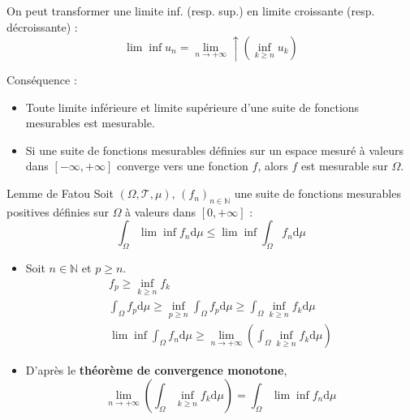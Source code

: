 \begin{Prop}{}{}
On peut transformer une limite inf. (resp. sup.) en limite croissante (resp. décroissante) : 
\begin{equation}
  \lim \inf u_n = \underset{n \to + \infty}{\lim} \uparrow \left( \underset{k \ge n}{\inf} u_k \right)
\end{equation}

Conséquence : 
\begin{itemize}

    \item Toute limite inférieure et limite supérieure d'une suite de fonctions mesurables est mesurable.

    \item Si une suite de fonctions mesurables définies sur un espace mesuré à valeurs dans $[-\infty, +\infty]$ converge vers une fonction $f$, alors $f$ est mesurable sur $\Omega$.

\end{itemize}
\end{Prop}



\begin{Prop}{Lemme de Fatou}{}
  Soit $(\Omega, \mathscr{T}, \mu)$, $(f_n) _{n \in \mathbb{N}}$ une suite de fonctions mesurables {\color{red} positives} définies sur $\Omega$ à valeurs dans $[0, + \infty]$ : 
  \begin{equation}
    \int_{\Omega}^{} \lim \inf f_n \mathrm{d} \mu \le \lim \inf \int_{\Omega}^{} f_n \mathrm{d}\mu
  \end{equation}
\end{Prop}

\begin{myproof}{}{}
\begin{itemize}

    \item Soit $n \in \mathbb{N}$ et $p \ge n$. 
      \begin{gather}
        f_p \ge \underset{k \ge n}{\inf} f_k \\
        \int_{\Omega}^{} f_p \mathrm{d}\mu \ge \underset{p \ge n}{\inf}\int_{\Omega}^{} f_p \mathrm{d}\mu \ge \int_{\Omega}^{} \underset{k \ge n}{\inf} f_k \mathrm{d} \mu\\ 
        \lim \inf \int_{\Omega}^{} f_n \mathrm{d} \mu \ge \underset{n \to + \infty}{\lim} \left( \int_{\Omega}^{} \underset{k \ge n}{\inf} f_k \mathrm{d}\mu\right)
      \end{gather}

    \item D'après le \textbf{théorème de convergence monotone}, 
      \begin{equation}
        \underset{n \to + \infty}{\lim} \left( \int_{\Omega}^{} \underset{k \ge n}{\inf} f_k \mathrm{d}\mu\right) = \int_{\Omega}^{} \lim \inf f_n \mathrm{d} \mu
      \end{equation}
\end{itemize}
\end{myproof}



